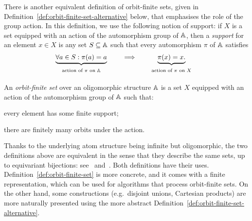 There is another equivalent definition of orbit-finite sets, 
given in Definition~\ref{def:orbit-finite-set-alternative} below, that emphasises the role of the group action. 
In this definition, we use the following notion of support: 
if $X$ is a set equipped with an action of the automorphism group of $\mathbb{A}$, 
then a \emph{support} for an element $x \in X$ is any set $S \subseteq \mathbb{A}$ such that every automorphism $\pi$ of $\mathbb{A}$ satisfies
\begin{align*}
   \myunderbrace{\forall a \in S : \pi(a)=a}{action of $\pi$ on $\A$}
   \qquad \implies \quad
   \myunderbrace{\pi(x)=x.}{action of $\pi$ on $X$}
\end{align*}
\begin{definition}
    \label{def:orbit-finite-set-alternative} An \emph{orbit-finite set} over an oligomorphic structure $\mathbb{A}$ is a set $X$ equipped with an action of the automorphism group of $\mathbb{A}$ such that: 
   \begin{bracketenumerate}
      \item every element has some finite support;
      \item there are finitely many orbits under the action.
   \end{bracketenumerate}
\end{definition}

Thanks to the underlying atom structure being infinite but oligomorphic, the two definitions above are equivalent 
in the sense that they describe the same sets, up to equivariant bijections: see~\cite[Thm.~5.12]{bojanczyk_slightly} and~\cite[Prop.~2.19]{BodirskyBodorMarimon_25}. 
Both definitions have their uses. 
Definition~\ref{def:orbit-finite-set} is more concrete, and it comes with a finite representation, which can be used for algorithms that process orbit-finite sets. 
On the other hand, some constructions (e.g.~disjoint unions, Cartesian products) are more naturally presented using the more abstract Definition~\ref{def:orbit-finite-set-alternative}. 
